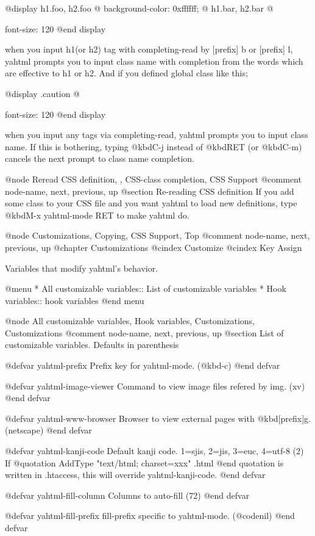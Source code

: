 @display
 h1.foo, h2.foo @{ background-color: 0xffffff; @}
 h1.bar, h2.bar @{ font-size: 120%
@end display

when you input h1(or h2) tag with completing-read by [prefix] b or
[prefix] l, yahtml prompts you to input class name with completion from
the words which are effective to h1 or h2.  And if you defined 
global class like this;

@display
 .caution @{ font-size: 120%
@end display

when you input any tags via completing-read, yahtml prompts you to input
class name.  If this is bothering, typing @kbd{C-j} instead of
@kbd{RET} (or @kbd{C-m}) cancels the next prompt to class name completion.

@node Reread CSS definition,  , CSS-class completion, CSS Support
@comment  node-name,  next,  previous,  up
@section Re-reading CSS definition
If you add some class to your CSS file and you want yahtml to load
new definitions, type @kbd{M-x yahtml-mode RET} to make yahtml do.

@node Customizations, Copying, CSS Support, Top
@comment  node-name,  next,  previous,  up
@chapter Customizations
@cindex Customize
@cindex Key Assign

Variables that modify yahtml's behavior.

@menu
* All customizable variables::  List of customizable variables
* Hook variables::              hook variables
@end menu

@node All customizable variables, Hook variables, Customizations, Customizations
@comment  node-name,  next,  previous,  up
@section List of customizable variables.  Defaults in parenthesis

@defvar yahtml-prefix
Prefix key for yahtml-mode.  (@kbd{\C-c})
@end defvar

@defvar yahtml-image-viewer
Command to view image files refered by img. (xv)
@end defvar

@defvar yahtml-www-browser
Browser to view external pages with @kbd{[prefix]g}. (netscape)
@end defvar

@defvar yahtml-kanji-code
Default kanji code. 1=sjis, 2=jis, 3=euc, 4=utf-8 (2)
If
@quotation
 AddType "text/html; charset=xxx" .html
@end quotation
is written in .htaccess, this will override yahtml-kanji-code.
@end defvar

@defvar yahtml-fill-column
Columns to auto-fill (72)
@end defvar

@defvar yahtml-fill-prefix
fill-prefix specific to yahtml-mode. (@code{nil})
@end defvar

}}
